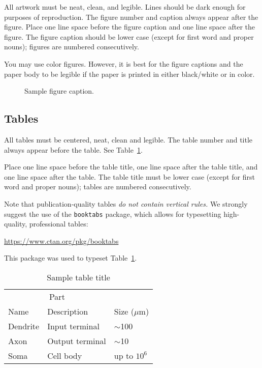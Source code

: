 \documentclass[final]{article}
\begin{document}
\begin{itemize}
All artwork must be neat, clean, and legible. Lines should be dark
enough for purposes of reproduction. The figure number and caption
always appear after the figure. Place one line space before the figure
caption and one line space after the figure. The figure caption should
be lower case (except for first word and proper nouns); figures are
numbered consecutively.

You may use color figures.  However, it is best for the figure
captions and the paper body to be legible if the paper is printed in
either black/white or in color.
\begin{figure}[h]
  \centering
  \fbox{\rule[-.5cm]{0cm}{4cm} \rule[-.5cm]{4cm}{0cm}}
  \caption{Sample figure caption.}
\end{figure}

\subsection{Tables}

All tables must be centered, neat, clean and legible.  The table
number and title always appear before the table.  See
Table~\ref{sample-table}.

Place one line space before the table title, one line space after the
table title, and one line space after the table. The table title must
be lower case (except for first word and proper nouns); tables are
numbered consecutively.

Note that publication-quality tables \emph{do not contain vertical
  rules.} We strongly suggest the use of the \verb+booktabs+ package,
which allows for typesetting high-quality, professional tables:
\begin{center}
  \url{https://www.ctan.org/pkg/booktabs}
\end{center}
This package was used to typeset Table~\ref{sample-table}.

\begin{table}[t]
  \caption{Sample table title}
  \label{sample-table}
  \centering
  \begin{tabular}{lll}
    \toprule
    \multicolumn{2}{c}{Part}                   \\
    \cmidrule{1-2}
    Name     & Description     & Size ($\mu$m) \\
    \midrule
    Dendrite & Input terminal  & $\sim$100     \\
    Axon     & Output terminal & $\sim$10      \\
    Soma     & Cell body       & up to $10^6$  \\
    \bottomrule
  \end{tabular}
\end{table}


\end{itemize}
\end{document}
